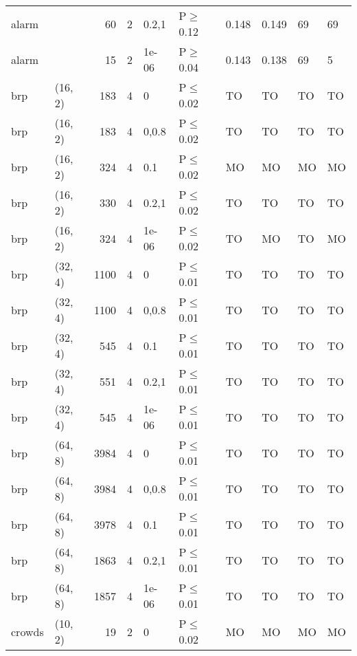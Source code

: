 \begin{longtable}{llrrllllll}
 alarm         &          &     	60 &   2 & 0.2,1 & P$\geq$0.12  & 0.148    & 0.149    & 69      & 69     \\
 alarm         &          &     	15 &   2 & 1e-06 & P$\geq$0.04  & 0.143    & 0.138    & 69      & 5      \\
 brp           & (16, 2)  &    	183 &   4 & 0     & P$\leq$0.02  & TO       & TO       & TO      & TO     \\
 brp           & (16, 2)  &    	183 &   4 & 0,0.8 & P$\leq$0.02  & TO       & TO       & TO      & TO     \\
 brp           & (16, 2)  &    	324 &   4 & 0.1   & P$\leq$0.02  & MO       & MO       & MO      & MO     \\
 brp           & (16, 2)  &    	330 &   4 & 0.2,1 & P$\leq$0.02  & TO       & TO       & TO      & TO     \\
 brp           & (16, 2)  &    	324 &   4 & 1e-06 & P$\leq$0.02  & TO       & MO       & TO      & MO     \\
 brp           & (32, 4)  &   	1100 &   4 & 0     & P$\leq$0.01  & TO       & TO       & TO      & TO     \\
 brp           & (32, 4)  &   	1100 &   4 & 0,0.8 & P$\leq$0.01  & TO       & TO       & TO      & TO     \\
 brp           & (32, 4)  &    	545 &   4 & 0.1   & P$\leq$0.01  & TO       & TO       & TO      & TO     \\
 brp           & (32, 4)  &    	551 &   4 & 0.2,1 & P$\leq$0.01  & TO       & TO       & TO      & TO     \\
 brp           & (32, 4)  &    	545 &   4 & 1e-06 & P$\leq$0.01  & TO       & TO       & TO      & TO     \\
 brp           & (64, 8)  &   	3984 &   4 & 0     & P$\leq$0.01  & TO       & TO       & TO      & TO     \\
 brp           & (64, 8)  &   	3984 &   4 & 0,0.8 & P$\leq$0.01  & TO       & TO       & TO      & TO     \\
 brp           & (64, 8)  &   	3978 &   4 & 0.1   & P$\leq$0.01  & TO       & TO       & TO      & TO     \\
 brp           & (64, 8)  &   	1863 &   4 & 0.2,1 & P$\leq$0.01  & TO       & TO       & TO      & TO     \\
 brp           & (64, 8)  &   	1857 &   4 & 1e-06 & P$\leq$0.01  & TO       & TO       & TO      & TO     \\
 crowds        & (10, 2)  &     	19 &   2 & 0     & P$\leq$0.02  & MO       & MO       & MO      & MO     \\

\end{longtable}
